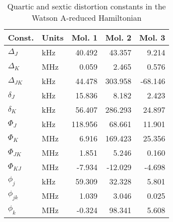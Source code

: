 \begin{table}
\centering
\caption{Quartic and sextic distortion constants in the Watson A-reduced Hamiltonian}
\begin{tabular}{llrrr}
Const.        & Units    &     Mol. 1 &     Mol. 2 &     Mol. 3 \\
\hline
$\Delta_{J}$  & kHz      &     40.492 &     43.357 &      9.214 \\
$\Delta_{K}$  & MHz      &      0.059 &      2.465 &      0.576 \\
$\Delta_{JK}$ & kHz      &     44.478 &    303.958 &    -68.146 \\
$\delta_{J}$  & kHz      &     15.836 &      8.182 &      2.423 \\
$\delta_{K}$  & kHz      &     56.407 &    286.293 &     24.897 \\
\hline
$\Phi_{J}$    & kHz      &    118.956 &     68.661 &     11.901 \\
$\Phi_{K}$    & MHz      &      6.916 &    169.423 &     25.356 \\
$\Phi_{JK}$   & MHz      &      1.851 &      5.246 &      0.160 \\
$\Phi_{KJ}$   & MHz      &     -7.934 &    -12.029 &     -4.698 \\
$\phi_{j}$    & kHz      &     59.309 &     32.328 &      5.801 \\
$\phi_{jk}$   & MHz      &      1.039 &      3.046 &      0.025 \\
$\phi_{k}$    & MHz      &     -0.324 &     98.341 &      5.608 \\
\end{tabular}
\end{table}

